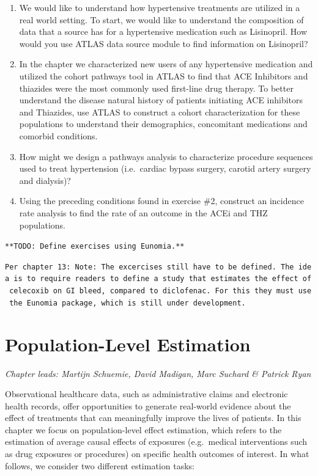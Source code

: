 \documentclass[11pt]{book}
\providecommand{\tightlist}{%
  \setlength{\itemsep}{0pt}\setlength{\parskip}{0pt}}
\theoremstyle{definition}
\theoremstyle{definition}
\theoremstyle{definition}
\theoremstyle{remark}
\begin{document}
\begin{enumerate}
\def\labelenumi{\arabic{enumi}.}
\tightlist
\item
  We would like to understand how hypertensive treatments are utilized in a real world setting. To start, we would like to understand the composition of data that a source has for a hypertensive medication such as Lisinopril. How would you use ATLAS data source module to find information on Lisinopril?
\item
  In the chapter we characterized new users of any hypertensive medication and utilized the cohort pathways tool in ATLAS to find that ACE Inhibitors and thiazides were the most commonly used first-line drug therapy. To better understand the disease natural history of patients initiating ACE inhibitors and Thiazides, use ATLAS to construct a cohort characterization for these populations to understand their demographics, concomitant medications and comorbid conditions.
\item
  How might we design a pathways analysis to characterize procedure sequences used to treat hypertension (i.e.~cardiac bypass surgery, carotid artery surgery and dialysis)?
\item
  Using the preceding conditions found in exercise \#2, construct an incidence rate analysis to find the rate of an outcome in the ACEi and THZ populations.
\end{enumerate}

\texttt{**TODO:\ Define\ exercises\ using\ Eunomia.**}

\texttt{Per\ chapter\ 13:\ Note:\ The\ excercises\ still\ have\ to\ be\ defined.\ The\ idea\ is\ to\ require\ readers\ to\ define\ a\ study\ that\ estimates\ the\ effect\ of\ celecoxib\ on\ GI\ bleed,\ compared\ to\ diclofenac.\ For\ this\ they\ must\ use\ the\ Eunomia\ package,\ which\ is\ still\ under\ development.}

\hypertarget{PopulationLevelEstimation}{%
\chapter{Population-Level Estimation}\label{PopulationLevelEstimation}}

\emph{Chapter leads: Martijn Schuemie, David Madigan, Marc Suchard \& Patrick Ryan}


Observational healthcare data, such as administrative claims and electronic health records, offer opportunities to generate real-world evidence about the effect of treatments that can meaningfully improve the lives of patients. In this chapter we focus on population-level effect estimation, which refers to the estimation of average causal effects of exposures (e.g.~medical interventions such as drug exposures or procedures) on specific health outcomes of interest. In what follows, we consider two different estimation tasks:
\end{document}
